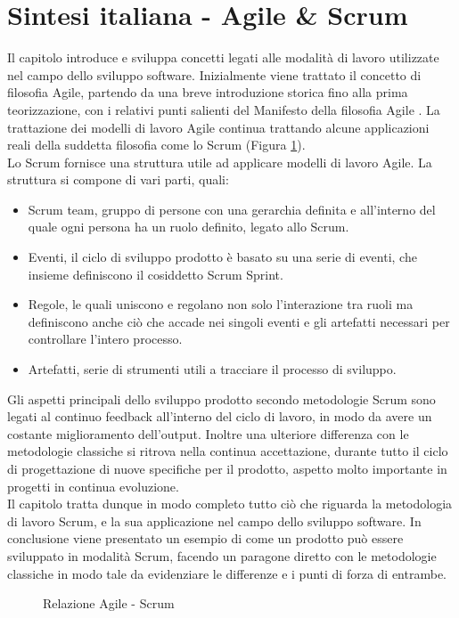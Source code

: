 \documentclass[../main.tex]{subfiles}
\begin{document}
\section{Sintesi italiana - Agile \& Scrum}
Il capitolo introduce e sviluppa concetti legati alle modalità di lavoro utilizzate nel campo dello sviluppo software. Inizialmente viene trattato il concetto di filosofia Agile, partendo da una breve introduzione storica fino alla prima teorizzazione, con i relativi punti salienti del Manifesto della filosofia Agile \cite{beck2001agile}. La trattazione dei modelli di lavoro Agile continua trattando alcune applicazioni reali della suddetta filosofia come lo Scrum (Figura \ref{fig:agilesrre}).\\
Lo Scrum fornisce una struttura utile ad applicare modelli di lavoro Agile. La struttura si compone di vari parti, quali:
\begin{itemize}
    \item Scrum team, gruppo di persone con una gerarchia definita e all'interno del quale ogni persona ha un ruolo definito, legato allo Scrum.
    \item Eventi, il ciclo di sviluppo prodotto è basato su una serie di eventi, che insieme definiscono il cosiddetto Scrum Sprint.
    \item Regole, le quali uniscono e regolano non solo l'interazione tra ruoli ma definiscono anche ciò che accade nei singoli eventi e gli artefatti necessari per controllare l'intero processo.
    \item Artefatti, serie di strumenti utili a tracciare il processo di sviluppo.
\end{itemize}
Gli aspetti principali dello sviluppo prodotto secondo metodologie Scrum sono legati al continuo feedback all'interno del ciclo di lavoro, in modo da avere un costante miglioramento dell'output. Inoltre una ulteriore differenza con le metodologie  classiche si ritrova nella continua accettazione, durante tutto il ciclo di progettazione di nuove specifiche per il prodotto, aspetto molto importante in progetti in continua evoluzione.\\
Il capitolo tratta dunque in modo completo tutto ciò che riguarda la metodologia di lavoro Scrum, e la sua applicazione nel campo dello sviluppo software. In conclusione viene presentato un esempio di come un prodotto può essere sviluppato in modalità Scrum, facendo un paragone diretto con le metodologie classiche in modo tale da evidenziare le differenze e i punti di forza di entrambe.
\begin{figure}
    \centering
{} 
    \caption{Relazione Agile - Scrum}
    \label{fig:agilesrre}
\end{figure}
\end{document}
